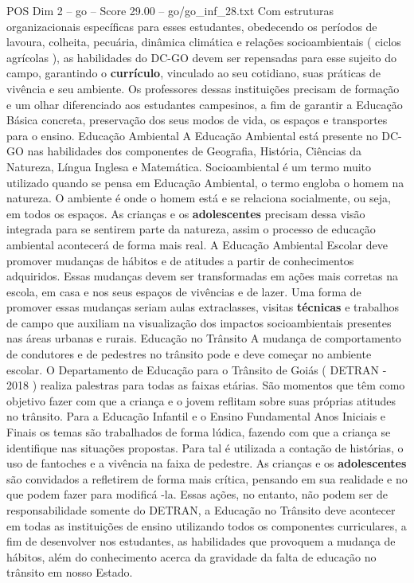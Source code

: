\begin{textsample}{POS Dim 2 – go – Score 29.00 – go/go\_inf\_28.txt}
Com estruturas organizacionais específicas para esses estudantes, obedecendo os períodos de lavoura, colheita, pecuária, dinâmica climática e relações socioambientais ( ciclos agrícolas ), as habilidades do DC-GO devem ser repensadas para esse sujeito do campo, garantindo o \textbf{currículo}, vinculado ao seu cotidiano, suas práticas de vivência e seu ambiente.
Os professores dessas instituições precisam de formação e um olhar diferenciado aos estudantes campesinos, a fim de garantir a Educação Básica concreta, preservação dos seus modos de vida, os espaços e transportes para o ensino.
Educação Ambiental A Educação Ambiental está presente no DC-GO nas habilidades dos componentes de Geografia, História, Ciências da Natureza, Língua Inglesa e Matemática.
Socioambiental é um termo muito utilizado quando se pensa em Educação Ambiental, o termo engloba o homem na natureza.
O ambiente é onde o homem está e se relaciona socialmente, ou seja, em todos os espaços.
As crianças e os \textbf{adolescentes} precisam dessa visão integrada para se sentirem parte da natureza, assim o processo de educação ambiental acontecerá de forma mais real.
A Educação Ambiental Escolar deve promover mudanças de hábitos e de atitudes a partir de conhecimentos adquiridos.
Essas mudanças devem ser transformadas em ações mais corretas na escola, em casa e nos seus espaços de vivências e de lazer.
Uma forma de promover essas mudanças seriam aulas extraclasses, visitas \textbf{técnicas} e trabalhos de campo que auxiliam na visualização dos impactos socioambientais presentes nas áreas urbanas e rurais.
Educação no Trânsito A mudança de comportamento de condutores e de pedestres no trânsito pode e deve começar no ambiente escolar.
O Departamento de Educação para o Trânsito de Goiás ( DETRAN - 2018 ) realiza palestras para todas as faixas etárias.
São momentos que têm como objetivo fazer com que a criança e o jovem reflitam sobre suas próprias atitudes no trânsito.
Para a Educação Infantil e o Ensino Fundamental Anos Iniciais e Finais os temas são trabalhados de forma lúdica, fazendo com que a criança se identifique nas situações propostas.
Para tal é utilizada a contação de histórias, o uso de fantoches e a vivência na faixa de pedestre.
As crianças e os \textbf{adolescentes} são convidados a refletirem de forma mais crítica, pensando em sua realidade e no que podem fazer para modificá -la.
Essas ações, no entanto, não podem ser de responsabilidade somente do DETRAN, a Educação no Trânsito deve acontecer em todas as instituições de ensino utilizando todos os componentes curriculares, a fim de desenvolver nos estudantes, as habilidades que provoquem a mudança de hábitos, além do conhecimento acerca da gravidade da falta de educação no trânsito em nosso Estado.

\end{textsample}
